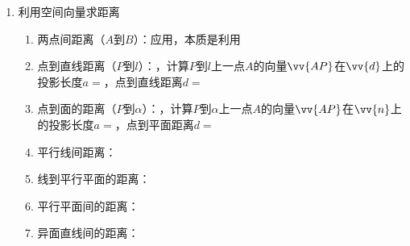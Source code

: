 \begin{enumerate}
    \item 利用空间向量求距离
    \begin{enumerate}
        \item 两点间距离（$A$到$B$）：应用，本质是利用
        \item 点到直线距离（$P$到$l$）：，计算$P$到$l$上一点$A$的向量$\vv{AP}$在$\vv{d}$上的投影长度$a = $，点到直线距离$d = $
        \item 点到面的距离（$P$到$\alpha$）：，计算$P$到$\alpha$上一点$A$的向量$\vv{AP}$在$\vv{n}$上的投影长度$a = $，点到平面距离$d = $
        \item 平行线间距离：
        \item 线到平行平面的距离：
        \item 平行平面间的距离：
        \item 异面直线间的距离：
        
    \end{enumerate}
\end{enumerate}
